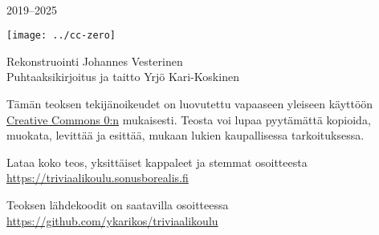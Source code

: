 \newpage
~\vfill
\thispagestyle{empty}
\setlength{\parindent}{0pt}
\setlength{\parskip}{\baselineskip}

2019–2025

\texttt{[image: ../cc-zero]}

Rekonstruointi Johannes Vesterinen \\
Puhtaaksikirjoitus ja taitto Yrjö Kari-Koskinen

Tämän teoksen tekijänoikeudet on luovutettu vapaaseen yleiseen käyttöön  \href{https://creativecommons.org/publicdomain/zero/1.0/deed.fi}{Creative Commons 0:n} mukaisesti. Teosta voi lupaa pyytämättä kopioida, muokata, levittää ja esittää, mukaan lukien kaupallisessa tarkoituksessa.

Lataa koko teos, yksittäiset kappaleet ja stemmat osoitteesta \url{https://triviaalikoulu.sonusborealis.fi}

Teoksen lähdekoodit on saatavilla osoitteessa \url{https://github.com/ykarikos/triviaalikoulu}


